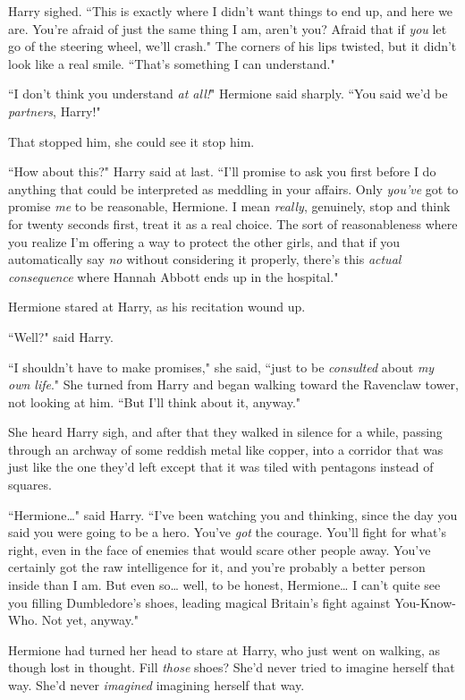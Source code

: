 Harry sighed. ``This is exactly where I didn't want things to end up, and here we are. You're afraid of just the same thing I am, aren't you? Afraid that if \emph{you} let go of the steering wheel, we'll crash." The corners of his lips twisted, but it didn't look like a real smile. ``That's something I can understand."

``I don't think you understand \emph{at all!}" Hermione said sharply. ``You said we'd be \emph{partners}, Harry!"

That stopped him, she could see it stop him.

``How about this?" Harry said at last. ``I'll promise to ask you first before I do anything that could be interpreted as meddling in your affairs. Only \emph{you've} got to promise \emph{me} to be reasonable, Hermione. I mean \emph{really}, genuinely, stop and think for twenty seconds first, treat it as a real choice. The sort of reasonableness where you realize I'm offering a way to protect the other girls, and that if you automatically say \emph{no} without considering it properly, there's this \emph{actual consequence} where Hannah Abbott ends up in the hospital."

Hermione stared at Harry, as his recitation wound up.

``Well?" said Harry.

``I shouldn't have to make promises," she said, ``just to be \emph{consulted} about \emph{my own life}." She turned from Harry and began walking toward the Ravenclaw tower, not looking at him. ``But I'll think about it, anyway."

She heard Harry sigh, and after that they walked in silence for a while, passing through an archway of some reddish metal like copper, into a corridor that was just like the one they'd left except that it was tiled with pentagons instead of squares.

``Hermione{\ldots}" said Harry. ``I've been watching you and thinking, since the day you said you were going to be a hero. You've \emph{got} the courage. You'll fight for what's right, even in the face of enemies that would scare other people away. You've certainly got the raw intelligence for it, and you're probably a better person inside than I am. But even so{\ldots} well, to be honest, Hermione{\ldots} I can't quite see you filling Dumbledore's shoes, leading magical Britain's fight against You-Know-Who. Not yet, anyway."

Hermione had turned her head to stare at Harry, who just went on walking, as though lost in thought. Fill \emph{those} shoes? She'd never tried to imagine herself that way. She'd never \emph{imagined} imagining herself that way.


